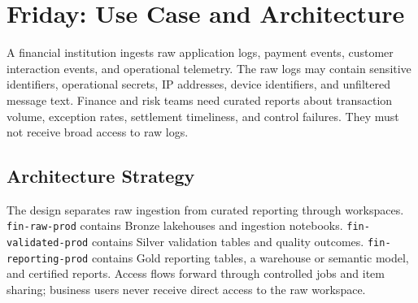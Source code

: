 \section{Friday: Use Case and Architecture}
A financial institution ingests raw application logs, payment events, customer interaction events, and operational telemetry. The raw logs may contain sensitive identifiers, operational secrets, IP addresses, device identifiers, and unfiltered message text. Finance and risk teams need curated reports about transaction volume, exception rates, settlement timeliness, and control failures. They must not receive broad access to raw logs.

\subsection{Architecture Strategy}
The design separates raw ingestion from curated reporting through workspaces. \texttt{fin-raw-prod} contains Bronze lakehouses and ingestion notebooks. \texttt{fin-validated-prod} contains Silver validation tables and quality outcomes. \texttt{fin-reporting-prod} contains Gold reporting tables, a warehouse or semantic model, and certified reports. Access flows forward through controlled jobs and item sharing; business users never receive direct access to the raw workspace.

